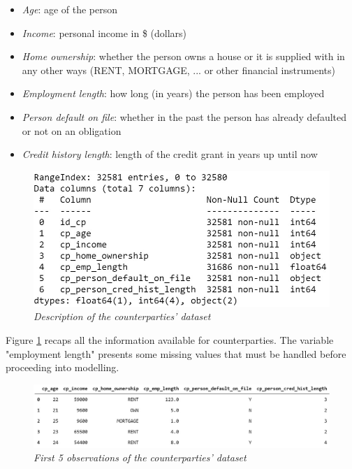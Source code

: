 \documentclass[a4paper,12pt]{article}
\begin{document}
        \begin{itemize} 
            \item \textit{Age}: age of the person  
            \item \textit{Income}: personal income in \$ (dollars) 
            \item \textit{Home ownership}: whether the person owns a house or it is supplied with in any other ways (RENT, MORTGAGE, ... or other financial instruments) 
            \item \textit{Employment length}: how long (in years) the person has been employed 
            \item \textit{Person default on file}: whether in the past the person has already defaulted or not on an obligation 
            \item \textit{Credit history length}: length of the credit grant in years up until now
        \end{itemize}
        
        \begin{figure}[H]
            \centerline{
                \includegraphics[width=\linewidth]{./images/cp_dataset_info.jpg}
            }
            \caption{\textit{Description of the counterparties' dataset}}
            \label{fig:cp_info}
         \end{figure}
           
    Figure \ref{fig:cp_info} recaps all the information available for counterparties. 
    The variable "employment length" presents some missing values
    that must be handled before proceeding into modelling.
    
        \begin{figure}[H]
            \centerline{
                \includegraphics[width=\linewidth]{./images/cp_dataset_head.jpg}
            }
            \caption{\textit{First 5 observations of the counterparties' dataset}}
            \label{fig:cp_head}
        \end{figure}
\end{document}
